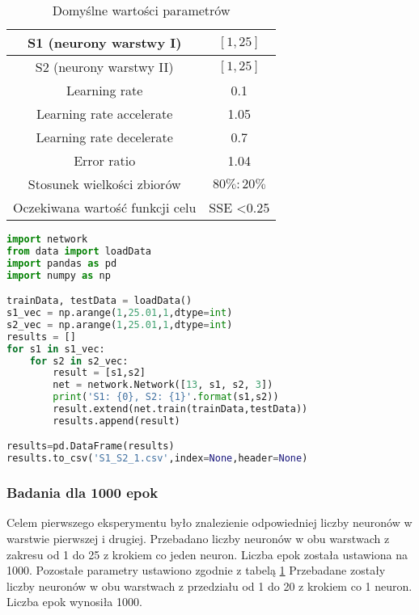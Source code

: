 \documentclass[12pt,twoside]{article}
\begin{document}
\begin{table}[H]
\begin{center}
\begin{tabular}{|c|c|}
\hline
S1 (neurony warstwy I) & $[1, 25]$\\
\hline
S2 (neurony warstwy II) & $[1, 25]$\\
\hline
Learning rate & 0.1\\
\hline
Learning rate accelerate & 1.05\\
\hline
Learning rate decelerate & 0.7\\
\hline
Error ratio & 1.04\\
\hline
Stosunek wielkości zbiorów & $80\% : 20\%$\\
\hline
Oczekiwana wartość funkcji celu & SSE <0.25\\
\hline
\end{tabular}
\caption{Domyślne wartości parametrów}
\label{tab2}
\end{center}
\end{table}

\begin{lstlisting}[language=Python,caption=Algorytm realizujący eksperyment 1,label={eks1}]
import network
from data import loadData
import pandas as pd
import numpy as np

trainData, testData = loadData()
s1_vec = np.arange(1,25.01,1,dtype=int)
s2_vec = np.arange(1,25.01,1,dtype=int)
results = []
for s1 in s1_vec:
	for s2 in s2_vec:
		result = [s1,s2]
		net = network.Network([13, s1, s2, 3])
		print('S1: {0}, S2: {1}'.format(s1,s2))
		result.extend(net.train(trainData,testData))
		results.append(result)

results=pd.DataFrame(results)
results.to_csv('S1_S2_1.csv',index=None,header=None)


\end{lstlisting}

\subsubsection{Badania dla 1000 epok}
Celem pierwszego eksperymentu było znalezienie odpowiedniej liczby neuronów w warstwie pierwszej i drugiej. Przebadano liczby neuronów w obu warstwach z zakresu od 1 do 25 z krokiem co jeden neuron. Liczba epok została ustawiona na 1000. Pozostałe parametry ustawiono zgodnie z tabelą \ref{tab2}
Przebadane zostały liczby neuronów w obu warstwach z przedziału od 1 do 20  z krokiem co 1 neuron. Liczba epok wynosiła 1000. 
\end{document}

